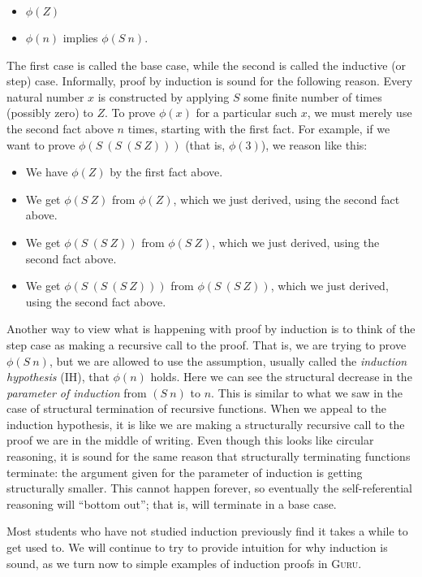 \documentclass{book}[12pt]
\newcommand{\guru}[0]{\textsc{Guru}\xspace}
\begin{document}
\begin{itemize}
\item $\phi(Z)$
\item $\phi(n)$ implies $\phi(S\ n)$.
\end{itemize}

\noindent The first case is called the base case, while the second is
called the inductive (or step) case.  Informally, proof by induction
is sound for the following reason.  Every natural number $x$ is
constructed by applying $S$ some finite number of times (possibly
zero) to $Z$.  To prove $\phi(x)$ for a particular such $x$, we must
merely use the second fact above $n$ times, starting with the first
fact.  For example, if we want to prove $\phi(S\ (S\ (S\ Z)))$ (that is,
$\phi(3)$), we reason like this:

\begin{itemize}
\item We have $\phi(Z)$ by the first fact above.
\item We get $\phi(S\ Z)$ from $\phi(Z)$, which we just derived, using the second fact above.
\item We get $\phi(S\ (S\ Z))$ from $\phi(S\ Z)$, which we just derived, using the second fact above.
\item We get $\phi(S\ (S\ (S\ Z)))$ from $\phi(S\ (S\ Z))$, which we just derived, using the second fact above.
\end{itemize}

Another way to view what is happening with proof by induction is to
think of the step case as making a recursive call to the proof.  That
is, we are trying to prove $\phi(S\ n)$, but we are allowed to use the
assumption, usually called the \emph{induction hypothesis} (IH), that
$\phi(n)$ holds.  Here we can see the structural decrease in the
\emph{parameter of induction} from $(S\ n)$ to $n$.  This is similar to
what we saw in the case of structural termination of recursive
functions.  When we appeal to the induction hypothesis, it is like we
are making a structurally recursive call to the proof we are in the
middle of writing.  Even though this looks like circular reasoning, it
is sound for the same reason that structurally terminating functions
terminate: the argument given for the parameter of induction is
getting structurally smaller.  This cannot happen forever, so
eventually the self-referential reasoning will ``bottom out''; that
is, will terminate in a base case.

Most students who have not studied induction previously find it takes
a while to get used to.  We will continue to try to provide intuition
for why induction is sound, as we turn now to simple examples of
induction proofs in \guru.
\end{document}
